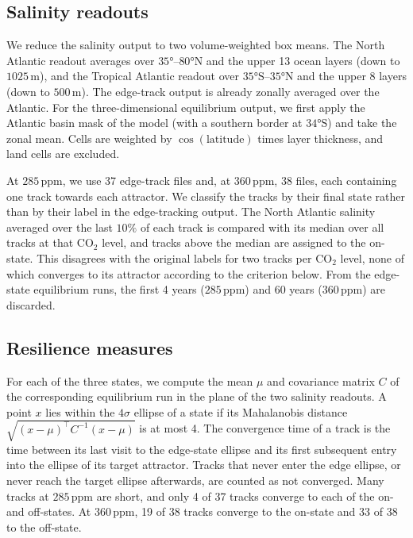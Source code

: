 \documentclass[12pt, a4paper]{article}
\newcommand{\CO}{CO\ensuremath{_2}}
\begin{document}
\subsection*{Salinity readouts}

We reduce the salinity output to two volume-weighted box means. The North Atlantic readout averages over $35°$--$80°\text{N}$ and the upper 13 ocean layers (down to $1025\,\text{m}$), and the Tropical Atlantic readout over $35°\text{S}$--$35°\text{N}$ and the upper 8 layers (down to $500\,\text{m}$). The edge-track output is already zonally averaged over the Atlantic. For the three-dimensional equilibrium output, we first apply the Atlantic basin mask of the model (with a southern border at $34°\text{S}$) and take the zonal mean. Cells are weighted by $\cos(\text{latitude})$ times layer thickness, and land cells are excluded.

At $285\,\text{ppm}$, we use 37 edge-track files and, at $360\,\text{ppm}$, 38 files, each containing one track towards each attractor. We classify the tracks by their final state rather than by their label in the edge-tracking output. The North Atlantic salinity averaged over the last $10\%$ of each track is compared with its median over all tracks at that \CO{} level, and tracks above the median are assigned to the on-state. This disagrees with the original labels for two tracks per \CO{} level, none of which converges to its attractor according to the criterion below. From the edge-state equilibrium runs, the first 4 years ($285\,\text{ppm}$) and 60 years ($360\,\text{ppm}$) are discarded.

\subsection*{Resilience measures}

For each of the three states, we compute the mean $\mu$ and covariance matrix $C$ of the corresponding equilibrium run in the plane of the two salinity readouts. A point $x$ lies within the $4\sigma$ ellipse of a state if its Mahalanobis distance $\sqrt{(x-\mu)^\top C^{-1}(x-\mu)}$ is at most 4. The convergence time of a track is the time between its last visit to the edge-state ellipse and its first subsequent entry into the ellipse of its target attractor. Tracks that never enter the edge ellipse, or never reach the target ellipse afterwards, are counted as not converged. Many tracks at $285\,\text{ppm}$ are short, and only 4 of 37 tracks converge to each of the on- and off-states. At $360\,\text{ppm}$, 19 of 38 tracks converge to the on-state and 33 of 38 to the off-state.
\end{document}
